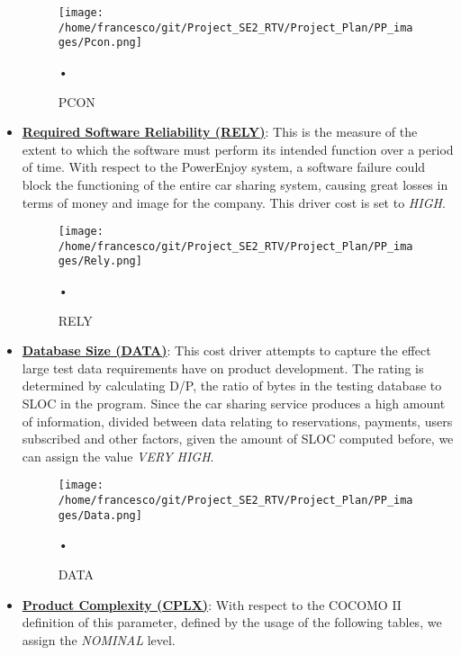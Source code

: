 \documentclass[10pt, a4paper,titlepage]{article}
\begin{document}
\begin{itemize}
\begin{figure}[h]
\begin{center}
\texttt{[image: /home/francesco/git/Project\_SE2\_RTV/Project\_Plan/PP\_images/Pcon.png]}
\caption{PCON}
\label{fig:PCON}
\end{center}•
\end{figure}
\linebreak
\item \underline{\textbf{Required Software Reliability (RELY)}}: This is the measure of the extent to which the software must perform its intended function over a period of time. With respect to the PowerEnjoy system, a software failure could block the functioning of the entire car sharing system, causing great losses in terms of money and image for the company. This driver cost is set to \emph{HIGH}.
\begin{figure}[h]
\begin{center}
\texttt{[image: /home/francesco/git/Project\_SE2\_RTV/Project\_Plan/PP\_images/Rely.png]}
\caption{RELY}
\label{fig:RELY}
\end{center}•
\end{figure}
\pagebreak
\item \underline{\textbf{Database Size (DATA)}}: This cost driver attempts to capture the effect large test data requirements have on product development. The rating is determined by calculating D/P, the ratio of bytes in the testing database to SLOC in the program. Since the car sharing service produces a high amount of information, divided between data relating to reservations, payments, users subscribed and other factors, given the amount of  SLOC computed before, we can assign the value \emph{VERY HIGH}.
\begin{figure}[h]
\begin{center}
\texttt{[image: /home/francesco/git/Project\_SE2\_RTV/Project\_Plan/PP\_images/Data.png]}
\caption{DATA}
\label{fig:DATA}
\end{center}•
\end{figure}
\pagebreak
\item \underline{\textbf{Product Complexity (CPLX)}}: With respect to the COCOMO II definition of this parameter, defined by the usage of the following tables, we assign the \emph{NOMINAL} level.
\begin{figure}[h]
\begin{center}

\end{center}
\end{figure}
\end{itemize}
\end{document}
